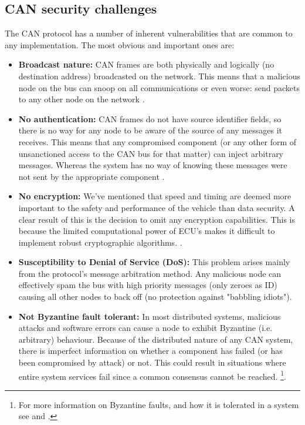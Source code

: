 \documentclass[11pt]{article}
\begin{document}
\subsection{CAN security challenges}
\label{sec:can_challenges}
The CAN protocol has a number of inherent vulnerabilities that are common to any implementation. The most obvious and important ones are:

\begin{itemize}
	\item \textbf{Broadcast nature:} CAN frames are both physically and logically (no destination address) broadcasted on the network. This means that a malicious node on the bus can snoop on all communications or even worse: send packets to any other node on the network \cite{Kosher}. 
	
	\item \textbf{No authentication:} CAN frames do not have source identifier fields, so there is no way for any node to be aware of the source of any messages it receives. This means that any compromised component (or any other form of unsanctioned access to the CAN bus for that matter) can inject arbitrary messages. Whereas the system has no way of knowing these messages were not sent by the appropriate component \cite{Kosher}\cite{CANissues}.
	
	\item \textbf{No encryption:} We've mentioned that speed and timing are deemed more important to the safety and performance of the vehicle than data security. A clear result of this is the decision to omit any encryption capabilities. This is because the limited  computational power of ECU’s makes it difficult to implement robust cryptographic algorithms. \cite{CANissues}.  
	
	\item \textbf{Susceptibility to Denial of Service (DoS):} This problem arises mainly from the protocol's message arbitration method. Any malicious node can effectively spam the bus with high priority messages (only zeroes as ID) causing all other nodes to back off (no protection against "babbling idiots"\cite{Pike15})\cite{Kosher}.
	
	\item \textbf{Not Byzantine fault tolerant:} In most distributed systems, malicious attacks and software errors can cause a node to exhibit Byzantine (i.e. arbitrary) behaviour\cite{Byzantine}. Because of the distributed nature of any CAN system, there is imperfect information on whether a component has failed (or has been compromised by attack) or not. This could result in situations where entire system services fail since a common consensus cannot be reached\cite{ByzantineFaultwiki}. \footnote{For more information on Byzantine faults, and how it is tolerated in a system see \cite{Byzantine} and \cite{ByzantineFaultwiki}.}.
	
\end{itemize}
\end{document}
